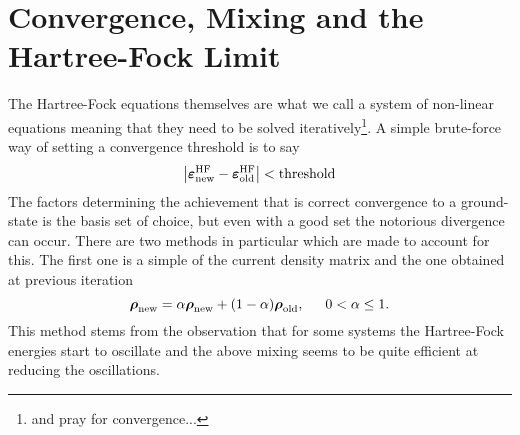 \section{Convergence, Mixing and the Hartree-Fock Limit}
    The Hartree-Fock equations themselves are what we call a system of
    non-linear equations meaning that they need to be solved
    iteratively\footnote{and pray for convergence...}. A simple brute-force way
    of setting a convergence threshold is to say
        \begin{equation}
            \abs{\boldsymbol{{\varepsilon}}^{\text{HF}}_{\text{new}} -
            \boldsymbol{{\varepsilon}}^{\text{HF}}_{\text{old}}} < \text{threshold}
            \label{eq:HFconvthresh}
        \end{equation}
    The factors determining the achievement that is correct convergence to a
    ground-state is the basis set of choice, but even with a good set the
    notorious divergence can occur.  There are two methods in particular which
    are made to account for this. The first one is a simple
    \cite{compphysThijssen} of the current density matrix and the
    one obtained at previous iteration
        \begin{equation}
            \blds{\rho}_{\text{new}} = \alpha\blds{\rho}_{\text{new}} + (1 -
            \alpha)\blds{\rho}_{\text{old}},\indent 0<\alpha\leq 1.
            \label{eq:mixing}
        \end{equation}
    This method stems from the observation that for some systems the
    Hartree-Fock energies start to oscillate and the above mixing seems to be
    quite efficient at reducing the oscillations.

